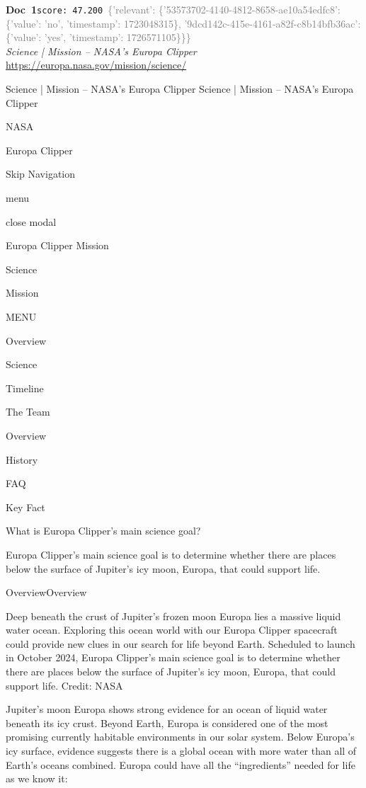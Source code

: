 \documentclass[a4paper,11pt]{article}
\begin{document}
\begin{docenv}
{\footnotesize\textcolor{doccolor}{\textbf{Doc~1}}}\hfill{\tiny\texttt{score:~47.200}}\ {\tiny\textcolor{gray}{\{'relevant': \{'53573702-4140-4812-8658-ae10a54edfc8': \{'value': 'no', 'timestamp': 1723048315\}, '9dcd142c-415e-4161-a82f-c8b14bfb36ac': \{'value': 'yes', 'timestamp': 1726571105\}\}\}}}\\[3pt]
{\small\textit{Science | Mission – NASA's Europa Clipper}}\\[2pt]
{\tiny\url{https://europa.nasa.gov/mission/science/}}\\[4pt]
{\footnotesize Science | Mission – NASA's Europa Clipper
Science | Mission – NASA's Europa Clipper

NASA

Europa Clipper

Skip Navigation

menu

close modal

Europa Clipper Mission

Science

Mission

MENU

Overview

Science

Timeline

The Team

Overview

History

FAQ

Key Fact

What is Europa Clipper's main science goal? 

Europa Clipper’s main science goal is to determine whether there are places below the surface of Jupiter’s icy moon, Europa, that could support life.

OverviewOverview

Deep beneath the crust of Jupiter’s frozen moon Europa lies a massive liquid water ocean. Exploring this ocean world with our Europa Clipper spacecraft could provide new clues in our search for life beyond Earth. Scheduled to launch in October 2024, Europa Clipper’s main science goal is to determine whether there are places below the surface of Jupiter’s icy moon, Europa, that could support life. Credit: NASA

Jupiter’s moon Europa shows strong evidence for an ocean of liquid water beneath its icy crust. Beyond Earth, Europa is considered one of the most promising currently habitable environments in our solar system. 
Below Europa’s icy surface, evidence suggests there is a global ocean with more water than all of Earth’s oceans combined. Europa could have all the “ingredients” needed for life as we know it: 

}
\end{docenv}
\end{document}

